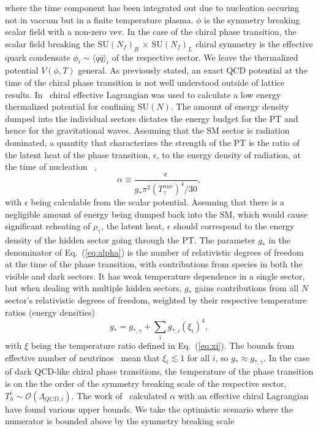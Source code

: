 \documentclass[nofootinbib,twocolumn,preprintnumbers]{revtex4-1}
\begin{document}
where the time component has been integrated out due to nucleation occuring not in vaccum but in a finite temperature plasma. $\phi$ is the symmetry breaking scalar field with a non-zero vev. In the case of the chiral phase transition, the scalar field breaking the SU$(N_f)_{R}$ $ \times$ SU$(N_f)_{L}$ chiral symmetry is the effective quark condensate $\phi_{i} \sim \langle q\bar{q} \rangle_{i}$ of the respective sector. We leave the thermalized potential $V(\phi, T)$ general. As previously stated, an exact QCD potential at the time of the chiral phase transition is not well understood outside of lattice results. In~\cite{Bai:2018dxf} chiral effective Lagrangian was used to calculate a low energy thermalized potential for confining SU$(N)$. 
The amount of energy density dumped into the individual sectors dictates the energy budget for the PT and hence for the gravitational waves. Assuming that the SM sector is radiation dominated, a quantity that characterizes the strength of the PT is the ratio of the latent heat of the phase transition, $\epsilon$, to the energy density of radiation, at the time of nucleation~\citep{Espinosa:2010hh} ,
\begin{equation}
\alpha     \equiv  \frac{\epsilon}{g_{*} \pi^2 (T^{nuc}_{\gamma})^4/30},
\label{eq:alpha}
\end{equation}
with $\epsilon$ being calculable from the scalar potential. Assuming that there is a negligible amount of energy being dumped back into the SM, which would cause significant reheating of $\rho_{\gamma}$,  the latent heat, $\epsilon$ should correspond to the energy density of the hidden sector going through the PT. The parameter $g_{*}$ in the denominator of Eq.~(\ref{eq:alpha}) is the number of relativistic degrees of freedom at the time of the phase transition, with contributions from species in both the visible and dark sectors. It has weak temperature dependence in a single sector, but when dealing with multiple hidden sectors, $g_{*}$ gains contributions from all $N$ sector's relativistic degrees of freedom, weighted by their respective temperature ratios (energy densities)
\begin{equation}\label{eqn:RelaDOF}
g_{*} = g_{*,\gamma} + \sum_{i} g_{*,i} (\xi_{i})^4,
\end{equation}
with $\xi$ being the temperature ratio defined in Eq.~(\ref{eq:xi}). The bounds from effective number of neutrinos~\citep{Aghanim:2018eyx} mean that $\xi_i \lesssim 1$ for all $i$, so $g_{*} \approx g_{*,\gamma}$. In the case of dark QCD-like chiral  phase transitions, the temperature of the phase transition is on the the order of the symmetry breaking scale of the respective sector, $T_{h}^{i} \sim \mathcal{O}(\Lambda_{QCD,i})$. The work of~\citep{Bai:2018dxf} calculated $\alpha$ with an effective chiral Lagrangian have found various upper bounds. We take the optimistic scenario where the numerator is bounded above by the symmetry breaking scale
\end{document}
